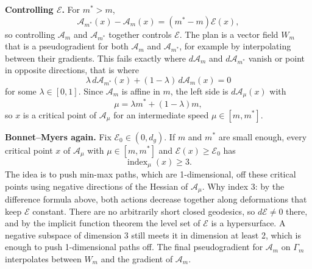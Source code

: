 \medskip\noindent
{\bf Controlling $\mathcal{E}$.} For
$m^* > m$,
$$
\mathcal{A}_{m^*}(x) - \mathcal{A}_m(x)
= (m^* - m)\mathcal{E}(x),
$$
so controlling $\mathcal{A}_m$ and
$\mathcal{A}_{m^*}$ together controls
$\mathcal{E}$. The plan is a vector field
$W_m$ that is a pseudogradient for both
$\mathcal{A}_m$ and $\mathcal{A}_{m^*}$, for
example by interpolating between their
gradients. This fails exactly where
$d\mathcal{A}_m$ and $d\mathcal{A}_{m^*}$
vanish or point in opposite directions,
that is where
$$
\lambda\, d\mathcal{A}_{m^*}(x)
+ (1 - \lambda)\, d\mathcal{A}_m(x) = 0
$$
for some $\lambda \in [0,1]$. Since
$\mathcal{A}_m$ is affine in $m$, the left
side is $d\mathcal{A}_\mu(x)$ with
$$
\mu = \lambda m^* + (1 - \lambda)m,
$$
so $x$ is a critical point of
$\mathcal{A}_\mu$ for an intermediate speed
$\mu \in [m,m^*]$.

\medskip\noindent
{\bf Bonnet--Myers again.} Fix
$\mathcal{E}_0 \in (0,d_g)$. If $m$ and
$m^*$ are small enough, every critical point
$x$ of $\mathcal{A}_\mu$ with
$\mu \in [m,m^*]$ and
$\mathcal{E}(x) \ge \mathcal{E}_0$ has
$$
\operatorname{index}_\mu(x) \ge 3.
$$
The idea is to push min-max paths, which
are 1-dimensional, off these critical points
using negative directions of the Hessian of
$\mathcal{A}_\mu$. Why index 3: by
the difference formula above, both actions
decrease together along deformations that
keep $\mathcal{E}$ constant. There are no
arbitrarily short closed geodesics, so
$d\mathcal{E} \neq 0$ there, and by the
implicit function theorem the level set of
$\mathcal{E}$ is a hypersurface. A negative
subspace of dimension 3 still meets it in
dimension at least 2, which is enough to
push 1-dimensional paths off. The final
pseudogradient for $\mathcal{A}_m$ on
$\Gamma_m$ interpolates between $W_m$ and
the gradient of $\mathcal{A}_m$.

